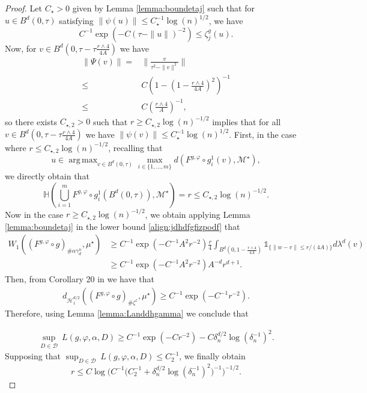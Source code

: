 \documentclass[10pt]{article}
\DeclareMathOperator*{\argmax}{arg\,max}
\begin{document}
\begin{proof}
Let $C_\star>0$ given by Lemma \ref{lemma:boundetaj} such that for $u\in B^d(0,\tau)$ satisfying $\|\psi(u)\|\leq C_\star^{-1}\log(n)^{1/2}$, we have
$$C^{-1}\exp(-C(\tau-\|u\|)^{-2})\leq \zeta_j^g(u).$$
Now, for $v\in B^d(0,\tau-\tau\frac{r\wedge 4}{4A})$ we have
\begin{align*}
    \|\Psi(v)\|=&\|\frac{v}{\tau^2-\|v\|^2}\|\\
    \leq & C(1-(1-\frac{r\wedge 4}{4A})^2)^{-1}\\
    \leq & C \left(\frac{r\wedge 4}{A}\right)^{-1},
\end{align*}
so there exists $C_{\star,2}>0$ such that $r\geq C_{\star,2}\log(n)^{-1/2}$ implies that for all $v\in B^d(0,\tau-\tau\frac{r\wedge 4}{4A})$ we have $\|\psi(v)\|\leq C_\star^{-1}\log(n)^{1/2}$. First, in the case where $r\leq C_{\star,2}\log(n)^{-1/2}$, recalling that
$$u \in \argmax_{v\in B^d(0,\tau)} \max_{i\in \{1,...,m\}}d(F^{g,\varphi}\circ g_i^1(v),\mathcal{M}^\star),$$
we directly obtain that
$$\mathbb{H}\left(\bigcup_{i=1}^m F^{g,\varphi}\circ g_i^1(B^d(0,\tau)),\mathcal{M}^\star\right)=r\leq C_{\star,2}\log(n)^{-1/2}.
$$
Now in the case $r\geq C_{\star,2}\log(n)^{-1/2}$, we obtain applying Lemma \ref{lemma:boundetaj} in the lower bound \eqref{align:jdhdfgfizpodf} that
\begin{align*}
    W_1((F^{g,\varphi}\circ g)_{\# \alpha \gamma_d^n},\mu^\star)
    & \geq C^{-1}\exp(-C^{-1}A^2r^{-2})\frac{r}{4}\int_{B^d(0,1-\frac{r\wedge 4}{4A})} \mathds{1}_{\{\|w-v\|\leq r/(4A)\}}d\lambda^d(v)\\
    & \geq C^{-1} \exp(-C^{-1}A^2r^{-2})A^{-d}r^{d+1}.
\end{align*}
 Then, from Corollary 20 in \cite{stephanovitch2024ipm} we have that
\begin{align*}
    d_{\mathcal{H}_1^{d/2}}\left((F^{g,\varphi}\circ g)_{\# \zeta^z},\mu^\star\right) \geq C^{-1} \exp(-C^{-1}r^{-2}).
\end{align*}
Therefore, using Lemma \ref{lemma:Landdhgamma} we conclude that 

\begin{align*}
    \sup_{D\in \mathcal{D}} \ L(g,\varphi,\alpha,D)\geq C^{-1} \exp(-Cr^{-2})-C \delta_n^{d/2}\log(\delta_n^{-1})^2.
\end{align*}
Supposing that $\sup_{D\in \mathcal{D}} \ L(g,\varphi,\alpha,D)\leq C_2^{-1}$, we finally obtain
$$r\leq C\log\Big(C^{-1}\Big(C_2^{-1}+\delta_n^{d/2}\log(\delta_n^{-1})^2\Big)^{-1}\Big)^{-1/2}.$$
\end{proof}
\end{document}
